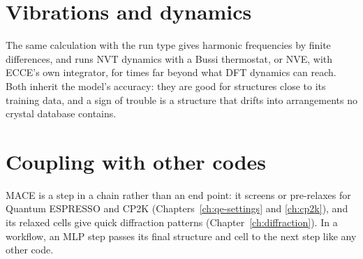 \section{Vibrations and dynamics}
The same calculation with the run type  gives harmonic frequencies by finite differences, and  runs NVT dynamics with a Bussi thermostat, or NVE, with ECCE's own integrator, for times far beyond what DFT dynamics can reach. Both inherit the model's accuracy: they are good for structures close to its training data, and a sign of trouble is a structure that drifts into arrangements no crystal database contains.

\section{Coupling with other codes}
MACE is a step in a chain rather than an end point: it screens or pre-relaxes for Quantum ESPRESSO and CP2K (Chapters~\ref{ch:qe-settings} and \ref{ch:cp2k}), and its relaxed cells give quick diffraction patterns (Chapter~\ref{ch:diffraction}). In a workflow, an MLP step passes its final structure and cell to the next step like any other code.
